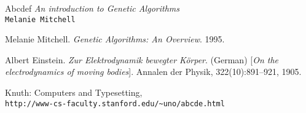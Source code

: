 \begin{thebibliography}{99}

Abcdef
\textit{An introduction to Genetic Algorithms}\\
\texttt{Melanie Mitchell}

Melanie Mitchell. 
\textit{Genetic Algorithms: An Overview}. 
1995.

Albert Einstein. 
\textit{Zur Elektrodynamik bewegter K{\"o}rper}. (German) 
[\textit{On the electrodynamics of moving bodies}]. 
Annalen der Physik, 322(10):891–921, 1905.

Knuth: Computers and Typesetting,
\\\texttt{http://www-cs-faculty.stanford.edu/\~{}uno/abcde.html}

\end{thebibliography}